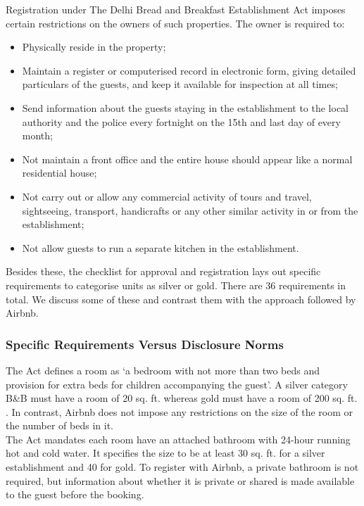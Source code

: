 \documentclass[a4paper, 12pt]{article}
\begin{document}
  Registration under The Delhi Bread and Breakfast Establishment Act imposes certain restrictions on the owners of such properties. The owner is required to: 
\begin{itemize}
\item Physically reside in the property;
\item Maintain a register or computerised record in electronic form, giving detailed particulars of the guests, and keep it available for inspection at all times;
\item  Send information about the guests staying in the establishment to the local authority and the police every fortnight on the 15th and last day of every month;
\item Not maintain a front office and the entire house should appear like a normal residential house;
\item Not carry out or allow any commercial activity of tours and travel, sightseeing, transport, handicrafts or any other similar activity in or from the establishment;
\item  Not allow guests to run a separate kitchen in the establishment.
\end{itemize}                                  
Besides these, the checklist for approval and registration lays out specific requirements to categorise units as silver or gold. There are 36 requirements in total. We discuss some of these and contrast them with the approach followed by Airbnb.

	\subsubsection{Specific Requirements Versus Disclosure Norms}
The Act defines a room as ‘a bedroom with not more than two beds and provision for extra beds for children accompanying the guest’. A silver category B\&B must have a room of 20 sq. ft. whereas gold must have a room of 200 sq. ft. . In contrast, Airbnb does not impose any restrictions on the size of the room or the number of beds in it.\\

The Act mandates each room have an attached bathroom with 24-hour running hot and cold water. It specifies the size to be at least 30 sq. ft. for a silver establishment and 40 for gold. To register with Airbnb, a private bathroom is not required, but information about whether it is private or shared is made available to the guest before the booking.\\
\end{document}
